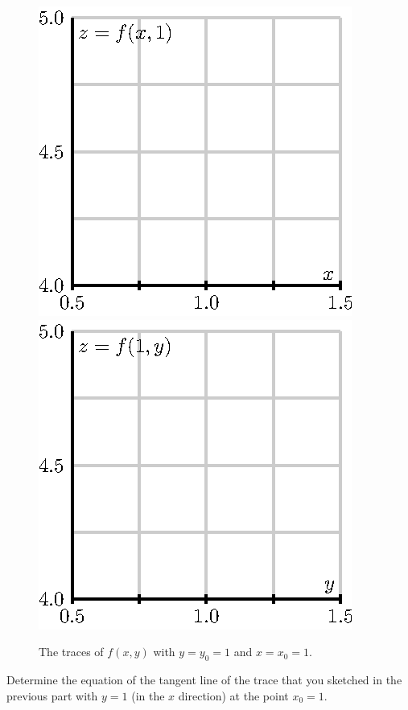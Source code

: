 \begin{pa}
  \begin{figure}[ht]
    \begin{center}
      \includegraphics{figures/fig_10_4_tangent_trace_y.eps}
      \hspace*{20pt}
      \includegraphics{figures/fig_10_4_tangent_trace_x.eps}
    \end{center}
    \caption{The traces of $f(x,y)$ with $y=y_0=1$ and $x=x_0=1$.}
    \label{F:10.4.traces}
  \end{figure}

\item Determine the equation of the tangent line of the trace that you sketched in the previous part with $y=1$ (in the $x$ direction) at the point $x_0=1$.  


\end{pa}
